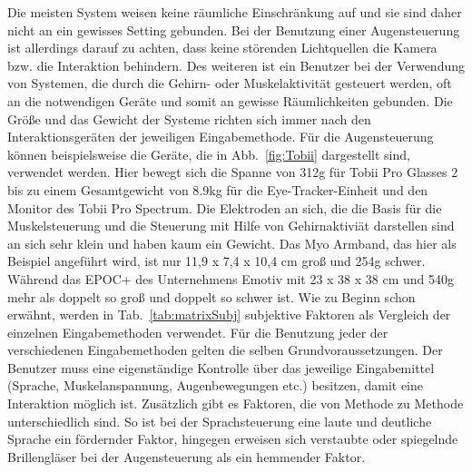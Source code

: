 \newline \newline \newline \newline \newline
Die meisten System weisen keine räumliche Einschränkung auf und sie sind daher nicht an ein gewisses Setting gebunden. Bei der Benutzung einer Augensteuerung ist allerdings darauf zu achten, dass keine störenden Lichtquellen die Kamera bzw. die Interaktion behindern. Des weiteren ist ein Benutzer bei der Verwendung von Systemen, die durch die Gehirn- oder Muskelaktivität gesteuert werden, oft an die notwendigen Geräte und somit an gewisse Räumlichkeiten gebunden.
\newline \newline
Die Größe und das Gewicht der Systeme richten sich immer nach den Interaktionsgeräten der jeweiligen Eingabemethode. Für die Augensteuerung können beispielsweise die Geräte, die in Abb.~\ref{fig:Tobii} dargestellt sind, verwendet werden. Hier bewegt sich die Spanne von 312g für Tobii Pro Glasses 2 bis zu einem Gesamtgewicht von 8.9kg für die Eye-Tracker-Einheit und den Monitor des Tobii Pro Spectrum. Die Elektroden an sich, die die Basis für die Muskelsteuerung und die Steuerung mit Hilfe von Gehirnaktiviät darstellen sind an sich sehr klein und haben kaum ein Gewicht. Das Myo Armband, das hier als Beispiel angeführt wird, ist nur 11,9 x 7,4 x 10,4 cm groß und 254g schwer. Während das EPOC+ des Unternehmens Emotiv mit 23 x 38 x 38 cm und 540g mehr als doppelt so groß und doppelt so schwer ist.
\newline \newline
Wie zu Beginn schon erwähnt, werden in Tab.~\ref{tab:matrixSubj} subjektive Faktoren als Vergleich der einzelnen Eingabemethoden verwendet.
\newline \newline
Für die Benutzung jeder der verschiedenen Eingabemethoden gelten die selben Grundvoraussetzungen. Der Benutzer muss eine eigenständige Kontrolle über das jeweilige Eingabemittel (Sprache, Muskelanspannung, Augenbewegungen etc.) besitzen, damit eine Interaktion möglich ist. Zusätzlich gibt es Faktoren, die von Methode zu Methode unterschiedlich sind. So ist bei der Sprachsteuerung eine laute und deutliche Sprache ein fördernder Faktor, hingegen erweisen sich verstaubte oder spiegelnde Brillengläser bei der Augensteuerung als ein hemmender Faktor.
\newline \newline
